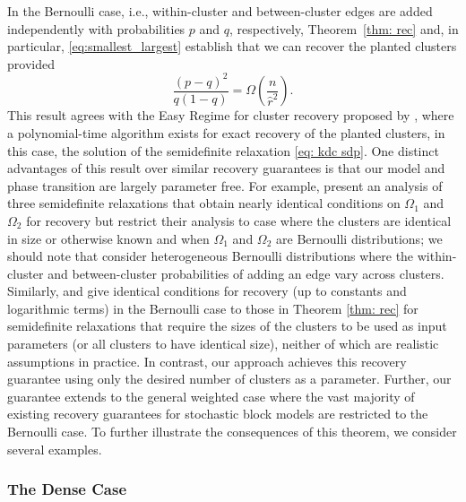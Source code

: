 \documentclass[twoside,11pt]{article}
\newcommand{\0}{\bs{0}}
\newcommand{\rbra}[1]{\ensuremath{\left( #1 \right)}} %
\begin{document}
{In the %
Bernoulli case, i.e., within-cluster and between-cluster edges are added independently with probabilities $p$ and $q$, respectively, Theorem~\ref{thm: rec} and, in particular, 
\eqref{eq:smallest_largest} establish that we can recover the planted
clusters provided
\[
	\frac{(p-q)^2}{q(1-q)} = \Omega\rbra{ \frac{ n }{\hat r^2}}.
\]
This result agrees with the Easy Regime for cluster recovery
proposed by \cite{chen2014statistical}, where a polynomial-time 
algorithm exists for exact recovery of the planted clusters, in this case, the solution of the semidefinite relaxation \eqref{eq: kdc sdp}.
One distinct advantages of this result over similar recovery guarantees
is that our model and phase transition are largely parameter free.
For example, \citet{amini2014semidefinite} present an analysis of three
semidefinite relaxations that obtain nearly identical conditions
on $\Omega_1$ and $\Omega_2$ for recovery but restrict their
analysis to case where the clusters are identical in size 
or otherwise known and when $\Omega_1$
and $\Omega_2$ are Bernoulli distributions; we should note that 
\citet{amini2014semidefinite}  consider heterogeneous Bernoulli
distributions where the within-cluster and between-cluster probabilities
of adding an edge vary across clusters.
Similarly, \citet{chen2014statistical} and \citet{jalali2015relative} give identical
conditions for recovery
(up to constants and logarithmic terms)
in the Bernoulli case
to those in Theorem \ref{thm: rec} for
semidefinite relaxations that require the sizes of the clusters to
be used as input parameters (or all clusters to have identical size), neither
of which are realistic assumptions in practice.
In contrast, our approach achieves this recovery guarantee
using only the desired number of clusters as a parameter.
Further, our guarantee extends to the general weighted case where
the vast majority of existing recovery guarantees for stochastic
block models are restricted to the Bernoulli case.
To further illustrate the consequences of this theorem, we consider
several examples.%


\subsubsection{The Dense Case}

}
\end{document}
